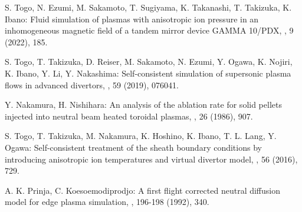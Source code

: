 \documentclass{jasse}%
\begin{document}
\begin{thebibliography}{99}
    S. Togo, N. Ezumi, M. Sakamoto, T. Sugiyama, K. Takanashi, T. Takizuka, K. Ibano:
    \newblock Fluid simulation of plasmas with anisotropic ion pressure in an inhomogeneous magnetic field of a tandem mirror device GAMMA 10/PDX,
    ,
    9 (2022), 185.

    S. Togo, T. Takizuka, D. Reiser, M. Sakamoto, N. Ezumi, Y. Ogawa, K. Nojiri, K. Ibano, Y. Li, Y. Nakashima:
    \newblock Self-consistent simulation of supersonic plasma flows in advanced divertors,
    , 
    59 (2019), 076041.

    Y. Nakamura, H. Nishihara:
    \newblock An analysis of the ablation rate for solid pellets injected into neutral beam heated toroidal plasmas,
    ,
    26 (1986), 907.

    S. Togo, T. Takizuka, M. Nakamura, K. Hoshino, K. Ibano, T. L. Lang, Y. Ogawa:
    \newblock Self-consistent treatment of the sheath boundary conditions by introducing anisotropic ion temperatures and virtual divertor model,
    , 
    56 (2016), 729.

    A. K. Prinja, C. Koesoemodiprodjo:
    \newblock A first flight corrected neutral diffusion model for edge plasma simulation,
    , 
    196-198 (1992), 340.

\end{thebibliography}
\end{document}
